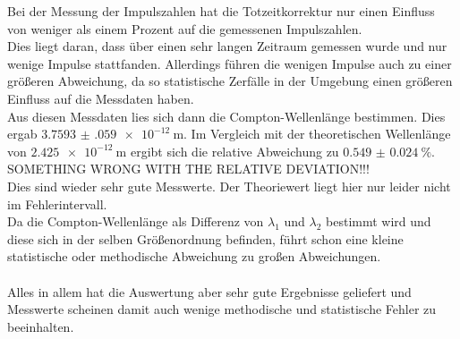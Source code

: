 \noindent Bei der Messung der Impulszahlen hat die Totzeitkorrektur nur einen Einfluss von weniger als einem Prozent auf die gemessenen Impulszahlen. \\
Dies liegt daran, dass über einen sehr langen Zeitraum gemessen wurde und nur wenige Impulse stattfanden. 
Allerdings führen die wenigen Impulse auch zu einer größeren Abweichung, da so statistische Zerfälle in der Umgebung einen größeren Einfluss auf die Messdaten haben.\\
Aus diesen Messdaten lies sich dann die Compton-Wellenlänge bestimmen. Dies ergab $\SI{3.7593(0590)e-12}{\meter}$.
Im Vergleich mit der theoretischen Wellenlänge von $\SI{2.425e-12}{\meter}$ ergibt sich die relative Abweichung zu $\SI{0.549(0024)}{\percent}$. \\
SOMETHING WRONG WITH THE RELATIVE DEVIATION!!!\\
Dies sind wieder sehr gute Messwerte. Der Theoriewert liegt hier nur leider nicht im Fehlerintervall.\\
Da die Compton-Wellenlänge als Differenz von $\lambda_1$ und $\lambda_2$ bestimmt wird und diese sich in der selben Größenordnung befinden, führt schon eine kleine statistische oder methodische Abweichung zu großen Abweichungen.\\\\
\noindent
Alles in allem hat die Auswertung aber sehr gute Ergebnisse geliefert und Messwerte scheinen damit auch wenige methodische und statistische Fehler zu beeinhalten.